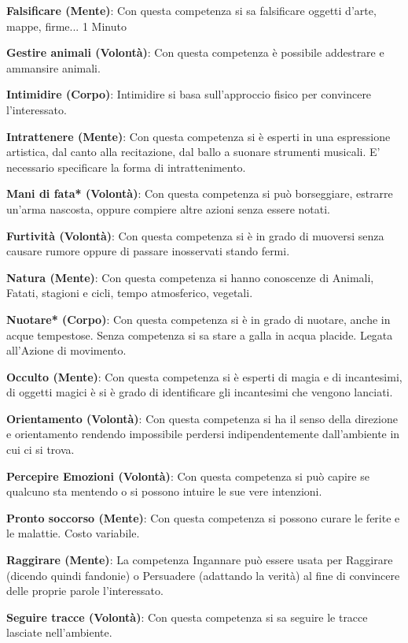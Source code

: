 \documentclass[12pt,a4paper,twoside,openany]{book}
\begin{document}
\begin{multicols}{2}
\textbf{Falsificare (Mente)}: Con questa competenza si sa falsificare oggetti d'arte, mappe, firme... 1 Minuto

\textbf{Gestire animali (Volontà)}: Con questa competenza è possibile addestrare e ammansire animali.

\textbf{Intimidire (Corpo)}: Intimidire si basa sull'approccio fisico per convincere l'interessato. 

\textbf{Intrattenere (Mente)}: Con questa competenza si è esperti in una espressione artistica, dal canto alla recitazione, dal ballo a suonare strumenti musicali. E' necessario specificare la forma di intrattenimento.

\textbf{Mani di fata* (Volontà)}: Con questa competenza si può borseggiare, estrarre un'arma nascosta, oppure compiere altre azioni senza essere notati. 

\textbf{Furtività (Volontà)}: Con questa competenza si è in grado di muoversi senza causare rumore oppure di passare inosservati stando fermi. 

\textbf{Natura (Mente)}: Con questa competenza si hanno conoscenze di Animali, Fatati, stagioni e cicli, tempo atmosferico, vegetali. 

\textbf{Nuotare* (Corpo)}: Con questa competenza si è in grado di nuotare, anche in acque tempestose. Senza competenza si sa stare a galla in acqua placide. Legata all'Azione di movimento.

\textbf{Occulto (Mente)}: Con questa competenza si è esperti di magia e di incantesimi, di oggetti magici è si è grado di identificare gli incantesimi che vengono lanciati. 

\textbf{Orientamento (Volontà)}: Con questa competenza si ha il senso della direzione e orientamento rendendo impossibile perdersi indipendentemente dall'ambiente in cui ci si trova. 

\textbf{Percepire Emozioni (Volontà)}: Con questa competenza si può capire se qualcuno sta mentendo o si possono intuire le sue vere intenzioni.

\textbf{Pronto soccorso (Mente)}: Con questa competenza si possono curare le ferite e le malattie. Costo variabile.

\textbf{Raggirare (Mente)}: La competenza Ingannare può essere usata per Raggirare (dicendo quindi fandonie) o Persuadere (adattando la verità) al fine di convincere delle proprie parole l'interessato.

\textbf{Seguire tracce (Volontà)}: Con questa competenza si sa seguire le tracce lasciate nell'ambiente. 


\end{multicols}
\end{document}

